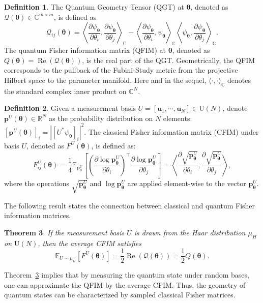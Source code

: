 \documentclass{amsart}
\theoremstyle{plain}
\newtheorem{theorem}{Theorem}
\theoremstyle{definition}
\newtheorem{defn}[theorem]{Definition}
\theoremstyle{remark}
\newcommand{\thmref}[1]{Theorem~\ref{#1}}
\newcommand{\RR}{\mathbb{R}}
\newcommand{\EE}{\mathbb{E}}
\begin{document}
\begin{defn}
\label{def:QFIM}
The Quantum Geometry Tensor (QGT) at $\bm\theta$, denoted as $\mathcal{Q}(\bm\theta)\in\mathbb{C}^{m\times m}$, is defined as
    \begin{equation}
        \label{eq:QGT}
        \mathcal{Q}_{ij}(\bm\theta)=\left\langle\frac{\partial\psi_{\bm\theta}}{\partial\theta_i},\frac{\partial\psi_{\bm\theta}}{\partial\theta_j}\right\rangle_{\mathbb{C}}-\left\langle\frac{\partial\psi_{\bm\theta}}{\partial\theta_i},\psi_{\bm\theta}\right\rangle_{\mathbb{C}}\left\langle\psi_{\bm\theta},\frac{\partial\psi_{\bm\theta}}{\partial\theta_j}\right\rangle_{\mathbb{C}}.
    \end{equation}
    The quantum Fisher information matrix (QFIM) at $\bm\theta$, denoted as $Q(\bm\theta)=\operatorname{Re}(\mathcal{Q}(\bm\theta))$, is the real part of the QGT. Geometrically, the QFIM corresponds to the pullback of the Fubini-Study metric from the projective Hilbert space to the parameter manifold. Here and in the sequel, $\langle \cdot, \cdot \rangle_{\mathbb{C}}$ denotes the standard complex inner product on $\mathbb{C}^N$.
\end{defn}
\begin{defn}
    Given a measurement basis $U=[\bm{u}_1,\cdots,\bm{u}_N]\in \mathrm U(N)$, denote $\bm{p}^U(\bm\theta)\in\RR^N$ as the probability distribution on $N$ elements: $[\bm p^U(\bm\theta)]_i=|[U^*\psi_{\bm\theta}]_i|^2$. The classical Fisher information matrix (CFIM) under basis $U$, denoted as $F^U(\bm\theta)$, is defined as:
    \begin{equation}
    \label{CFIM:def}
    F^U_{ij}(\bm\theta)=\frac{1}{4}\EE_{\bm{p}^U_{\bm\theta}}\left[\left(\frac{\partial \log{\bm{p}^U_{\bm\theta}}}{\partial\theta_i}\right)^\top\frac{\partial \log{\bm{p}^U_{\bm\theta}}}{\partial\theta_j}\right]=\left\langle\frac{\partial \sqrt{\bm{p}^U_{\bm\theta}}}{\partial\theta_i},\frac{\partial \sqrt{\bm{p}^U_{\bm\theta}}}{\partial\theta_j}\right\rangle,
\end{equation}
where the operations $\sqrt{\bm{p}^U_{\bm\theta}}$ and $\log{\bm{p}^U_{\bm\theta}}$ are applied element-wise to the vector $\bm{p}^U_{\bm\theta}$. 
\end{defn}

The following result states the connection between classical and quantum Fisher information matrices. 
\begin{theorem}
\label{1}
     If the measurement basis $U$ is drawn from the Haar distribution $\mu_H$ on $\mathrm U(N)$, then the average CFIM satisfies
    \begin{equation}
        \EE_{U\sim\mu_H}[F^U(\bm\theta)]=\frac{1}{2}\operatorname{Re}(\mathcal{Q}(\bm\theta))=\frac{1}{2}Q(\bm\theta).
    \end{equation}
\end{theorem}
\thmref{1} implies that by measuring the quantum state under random bases, one can approximate the QFIM by the average CFIM. Thus, the geometry of quantum states can be characterized by sampled classical Fisher matrices. 
\end{document}
